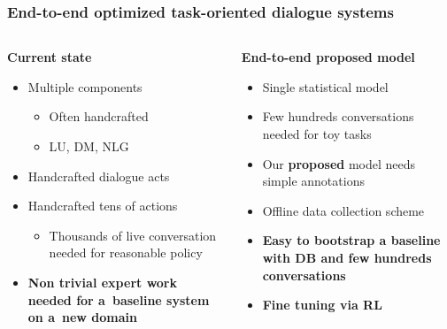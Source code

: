 \documentclass[10pt, compress,british,xcolor={svgnames,dvipsnames,x11names},trans]{beamer}
\begin{document}
\begin{frame}\frametitle{End-to-end optimized task-oriented dialogue systems}
\begin{columns}
\begin{column}{0.45\textwidth}
    {\bf Current state} \\
    \begin{itemize}
        \item Multiple components
            \begin{itemize}
                \item Often handcrafted
                \item LU, DM, NLG 
            \end{itemize}
        \item Handcrafted dialogue acts
        \item Handcrafted tens of actions
            \begin{itemize}
                \item Thousands of live conversation needed for reasonable policy~\cite{gasic_line_2011}
            \end{itemize}
        \item {\bf \color{red} Non trivial expert work needed for a~baseline system on a~new domain}
    \end{itemize}
\end{column}
\begin{column}{0.45\textwidth}
    {\bf End-to-end proposed model}
    \begin{itemize}
        \item Single statistical model
        \item Few hundreds conversations needed for toy tasks~\cite{wen_networkbased_2016}
        \item Our {\bf proposed} model needs simple annotations
        \item {\color{darkgreen} Offline data collection scheme}~\cite{wen_networkbased_2016,platek2016wochat}
        \item {\bf \color{darkgreen} Easy to bootstrap a baseline with DB and few hundreds conversations}
        \item {\bf \color{darkgreen} Fine tuning via RL}
    \end{itemize}
\end{column}
\end{columns}
\end{frame}
\end{document}

